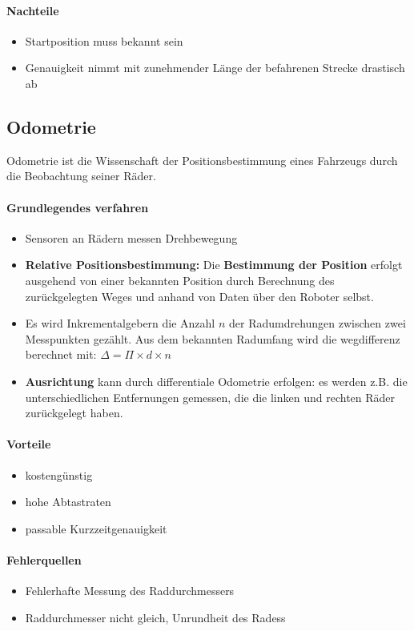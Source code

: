 \paragraph{Nachteile}
\begin{itemize}
	\item Startposition muss bekannt sein
	\item Genauigkeit nimmt mit zunehmender Länge der befahrenen Strecke drastisch ab
\end{itemize}
\subsection{Odometrie}
Odometrie ist die Wissenschaft der Positionsbestimmung eines Fahrzeugs durch die Beobachtung seiner Räder.
\paragraph{Grundlegendes verfahren}
\begin{itemize}
	\item Sensoren an Rädern messen Drehbewegung
	\item \textbf{Relative Positionsbestimmung:} Die \textbf{Bestimmung der Position} erfolgt ausgehend von einer bekannten Position durch Berechnung des zurückgelegten Weges und anhand von Daten über den Roboter selbst.
	\item Es wird Inkrementalgebern die Anzahl $n$ der Radumdrehungen zwischen zwei Messpunkten gezählt. Aus dem bekannten Radumfang wird die wegdifferenz berechnet mit:
	\subitem $\Delta = \Pi \times d \times n $
	\item \textbf{Ausrichtung} kann durch differentiale Odometrie erfolgen: es werden z.B. die unterschiedlichen Entfernungen gemessen, die die linken und rechten Räder zurückgelegt haben.
\end{itemize}
\paragraph{Vorteile}
\begin{itemize}
	\item kostengünstig
	\item hohe Abtastraten
	\item passable Kurzzeitgenauigkeit
\end{itemize}
\paragraph{Fehlerquellen}
\begin{itemize}
	\item Fehlerhafte Messung des Raddurchmessers
	\item Raddurchmesser nicht gleich, Unrundheit des Radess
\end{itemize}
